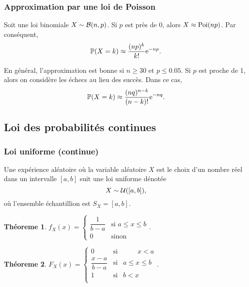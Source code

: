\documentclass[11pt]{article}
\renewcommand\P{%
	\ensuremath{%
		\mathbb{P}%
	}%
}%
\newcommand\e{%
	\ensuremath{%
		\mathrm{e}%
	}%
}%
\newcommand\bin{%
	\ensuremath{%
		\mathcal{B}%
	}%
}%
\newcommand\poi{%
	\ensuremath{%
		\mathrm{Poi}%
	}%
}%
\newcommand\uni{%
	\ensuremath{%
		\mathcal{U}%
	}%
}%
\newtheorem{theoreme}{Théoreme}[section]
\begin{document}
\subsubsection{Approximation par une loi de Poisson}
Soit une loi binomiale $X\sim\bin(n,p)$. Si $p$ est près de $0$, alors
$X\approx\poi(np)$. Par conséquent,
\begin{equation*}
	\P(X=k)\approx\frac{(np)^k}{k!}\e^{-np}.
\end{equation*}

En général, l'approximation est bonne si $n\geq 30$ et $p\leq 0.05$. Si $p$
est proche de 1, alors on considère les échecs au lieu des succès. Dans ce cas,
\begin{equation*}
	\P(X=k)\approx\frac{(nq)^{n-k}}{(n-k)!}\e^{-nq}.
\end{equation*}

\subsection{Loi des probabilités continues}
\subsubsection{Loi uniforme (continue)}
Une expérience aléatoire où la variable aléatoire $X$ est le choix d'un nombre
réel dans un intervalle $[a,b]$ suit une loi uniforme dénotée
\begin{equation*}
	X\sim\uni([a,b]),
\end{equation*}
où l'ensemble échantillion est $S_X=[a,b]$.

\begin{theoreme}
	$f_X(x)=\left\{
		\begin{matrix}
			\dfrac{1}{b-a} &\text{si } a\leq x\leq b\\
			0              &\text{sinon}
		\end{matrix}
	\right..
	$
\end{theoreme}

\begin{theoreme}
	$F_X(x)=\left\{
		\begin{matrix}
			0                &\text{si}& \;\phantom{a\leq}x<a\\
			\dfrac{x-a}{b-a} &\text{si}& a\leq x\leq b\\
			1                &\text{si}& b<x\phantom{\leq b}\;\\
		\end{matrix}
	\right.$.
\end{theoreme}
\end{document}
